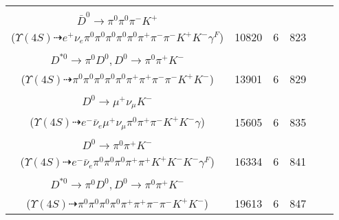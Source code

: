 \documentclass[landscape]{article}
\newcounter{rownumbers}
\newcommand\rn{\stepcounter{rownumbers}\arabic{rownumbers}}
\newcommand{\EOLP}{\\ \hline} %
\newcommand{\topoTags}[1]{#1} %
\begin{document}
\begin{longtable}{clcccc}
\rn & \makecell[l]{ $ 
\Upsilon(4S) \rightarrow B^{+} B^{-} ,
B^{+} \rightarrow e^{+} \nu_{e} \bar{D}^{*0} \gamma^{F} ,
B^{-} \rightarrow \rho^{-} D^{0} ,
\bar{D}^{*0} \rightarrow \pi^{0} \bar{D}^{0} ,
\rho^{-} \rightarrow \pi^{0} \pi^{-} ,
D^{0} \rightarrow \pi^{0} \pi^{+} K^{-} ,
$ \\ $
\bar{D}^{0} \rightarrow \pi^{0} \pi^{0} \pi^{-} K^{+} 
$ \\ ($
\Upsilon(4S) \dashrightarrow e^{+} \nu_{e} \pi^{0} \pi^{0} \pi^{0} \pi^{0} \pi^{0} \pi^{+} \pi^{-} \pi^{-} K^{+} K^{-} \gamma^{F} 
$) } & \topoTags{10820 & }6 & 823 \EOLP

\rn & \makecell[l]{ $ 
\Upsilon(4S) \rightarrow B^{+} B^{-} ,
B^{+} \rightarrow \rho^{+} \bar{D}^{0} ,
B^{-} \rightarrow \rho^{-} D^{*0} ,
\rho^{+} \rightarrow \pi^{0} \pi^{+} ,
\bar{D}^{0} \rightarrow \pi^{0} \pi^{-} K^{+} ,
\rho^{-} \rightarrow \pi^{0} \pi^{-} ,
$ \\ $
D^{*0} \rightarrow \pi^{0} D^{0} ,
D^{0} \rightarrow \pi^{0} \pi^{+} K^{-} 
$ \\ ($
\Upsilon(4S) \dashrightarrow \pi^{0} \pi^{0} \pi^{0} \pi^{0} \pi^{0} \pi^{+} \pi^{+} \pi^{-} \pi^{-} K^{+} K^{-} 
$) } & \topoTags{13901 & }6 & 829 \EOLP

\rn & \makecell[l]{ $ 
\Upsilon(4S) \rightarrow B^{+} B^{-} ,
B^{+} \rightarrow \rho^{+} \bar{D}^{0} ,
B^{-} \rightarrow e^{-} \bar{\nu}_{e} D^{*0} ,
\rho^{+} \rightarrow \pi^{0} \pi^{+} ,
\bar{D}^{0} \rightarrow \pi^{-} K^{+} ,
D^{*0} \rightarrow D^{0} \gamma ,
$ \\ $
D^{0} \rightarrow \mu^{+} \nu_{\mu} K^{-} 
$ \\ ($
\Upsilon(4S) \dashrightarrow e^{-} \bar{\nu}_{e} \mu^{+} \nu_{\mu} \pi^{0} \pi^{+} \pi^{-} K^{+} K^{-} \gamma 
$) } & \topoTags{15605 & }6 & 835 \EOLP

\rn & \makecell[l]{ $ 
\Upsilon(4S) \rightarrow B^{+} B^{-} ,
B^{+} \rightarrow \rho^{+} \bar{D}^{0} ,
B^{-} \rightarrow e^{-} \bar{\nu}_{e} D^{*0} \gamma^{F} ,
\rho^{+} \rightarrow \pi^{0} \pi^{+} ,
\bar{D}^{0} \rightarrow K^{+} K^{-} ,
D^{*0} \rightarrow \pi^{0} D^{0} ,
$ \\ $
D^{0} \rightarrow \pi^{0} \pi^{+} K^{-} 
$ \\ ($
\Upsilon(4S) \dashrightarrow e^{-} \bar{\nu}_{e} \pi^{0} \pi^{0} \pi^{0} \pi^{+} \pi^{+} K^{+} K^{-} K^{-} \gamma^{F} 
$) } & \topoTags{16334 & }6 & 841 \EOLP

\rn & \makecell[l]{ $ 
\Upsilon(4S) \rightarrow B^{+} B^{-} ,
B^{+} \rightarrow \rho^{+} \bar{D}^{0} ,
B^{-} \rightarrow \rho^{-} D^{*0} ,
\rho^{+} \rightarrow \pi^{0} \pi^{+} ,
\bar{D}^{0} \rightarrow \pi^{-} K^{+} ,
\rho^{-} \rightarrow \pi^{0} \pi^{-} ,
$ \\ $
D^{*0} \rightarrow \pi^{0} D^{0} ,
D^{0} \rightarrow \pi^{0} \pi^{+} K^{-} 
$ \\ ($
\Upsilon(4S) \dashrightarrow \pi^{0} \pi^{0} \pi^{0} \pi^{0} \pi^{+} \pi^{+} \pi^{-} \pi^{-} K^{+} K^{-} 
$) } & \topoTags{19613 & }6 & 847 \EOLP


\end{longtable}
\end{document}
